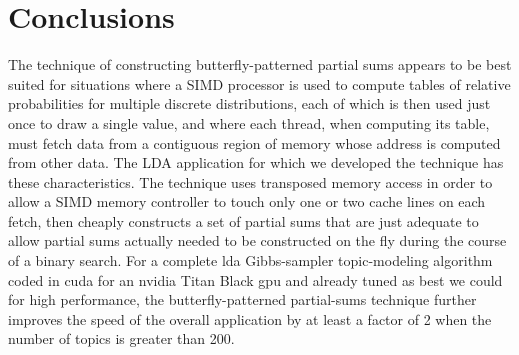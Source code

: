 \documentclass[10pt,nohyperref]{sigplanconf}
\begin{document}
\section{Conclusions}

The technique of constructing butterfly-patterned partial sums appears to be best suited
for situations where a SIMD processor is used to compute tables of relative probabilities for multiple discrete distributions,
each of which is then used just once to draw a single value, and where each thread, when computing its table,
must fetch data from a contiguous region of memory whose address is computed from other data.
The LDA application for which we developed the technique has these characteristics.
The technique uses transposed memory access in order to allow a SIMD memory controller
to touch only one or two cache lines on each fetch, then cheaply constructs a set of partial sums
that are just adequate to allow partial sums actually needed to be constructed on the fly
during the course of a binary search.
For a complete {\sc lda} Gibbs-sampler topic-modeling algorithm coded in {\sc cuda} for an {\sc nvidia}
Titan Black {\sc gpu} and already tuned as best we could for high performance, the butterfly-patterned
partial-sums technique further improves the speed of the overall application by at least a factor of 2
when the number of topics is greater than 200.








\end{document}
